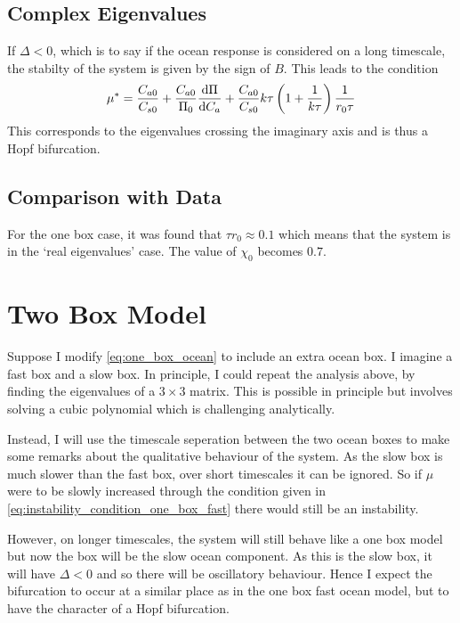 \subsection{Complex Eigenvalues}
If $\Delta < 0$, which is to say if the ocean response is considered on a long timescale, the stabilty of the system is given by the sign of $B$.
This leads to the condition
\begin{equation}
  \label{eq:instability_condition_one_box_slow}
  \mu^* =\frac{C_{a0}}{C_{s0}} + \frac{C_{a0}}{\Pi_0} \dv{\Pi}{C_a} + \frac{C_{a0}}{C_{s0}} k\tau\left(
     1 + \frac{1}{k\tau}
  \right) \frac{1}{r_0\tau}
\end{equation}
This corresponds to the eigenvalues crossing the imaginary axis and is thus a Hopf bifurcation.

\subsection{Comparison with Data}
For the one box case, it was found that $\tau r_0 \approx 0.1$ which means that the system is in the `real eigenvalues' case. The value of $\chi_0$ becomes
$0.7$.


\section{Two Box Model}
Suppose I modify \cref{eq:one_box_ocean} to include an extra ocean box. I imagine a fast box and a slow box. In principle, I could repeat the
analysis above, by finding the eigenvalues of a $3 \times 3$ matrix. This is possible in principle but involves solving a cubic polynomial which
is challenging analytically.

Instead, I will use the timescale seperation between the two ocean boxes to make some remarks about the qualitative behaviour of the system.
As the slow box is much slower than the fast box, over short timescales it can be ignored. So if $\mu$ were to be slowly increased through
the condition given in \cref{eq:instability_condition_one_box_fast} there would still be an instability.

However, on longer timescales, the system will still behave like a one box model but now the box will be the slow ocean component. As this is the slow box,
it will have $\Delta < 0$ and so there will be oscillatory behaviour. Hence I expect the bifurcation to occur at a similar place as in the one box fast ocean model,
but to have the character of a Hopf bifurcation.

